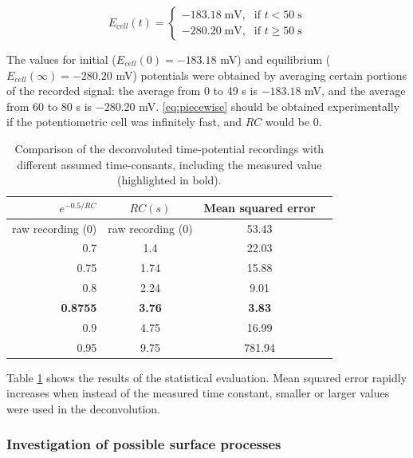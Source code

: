 \begin{equation}
E_{cell}(t) =
\left\{
	\begin{array}{ll}
		-183.18 \; \textrm{mV,} & \mbox{if } t < 50 \; \textrm{s} \\
		-280.20 \; \textrm{mV,} & \mbox{if } t \geq  50 \; \textrm{s}
	\end{array}
\right.
\label{eq:piecewise}
\end{equation}

The values for initial ($E_{cell}(0) = -183.18$ mV) and equilibrium ($E_{cell}(\infty) = -280.20$ mV) potentials were obtained by averaging certain portions of the recorded signal: the average from 0 to 49 s is $-183.18$ mV, and the average from 60 to 80 s is $-280.20$ mV.
\ref{eq:piecewise} should be obtained experimentally if the potentiometric cell was infinitely fast, and $RC$ would be 0.

\begin{table}
                \caption{Comparison of the deconvoluted time-potential recordings with different assumed time-consants, including the measured value (highlighted in bold).}
                \label{table:rc}
                \centering
                \begin{tabular}{r c c c}
                        $e^{-0.5/RC}$ & $RC (s)$ & Mean squared error \\
                        \hline
                        raw recording (0) & raw recording (0) & 53.43 \\
                        0.7 & 1.4 & 22.03  \\
                        0.75 & 1.74 & 15.88  \\
                        0.8 & 2.24 & 9.01 \\
			\textbf{0.8755} & \textbf{3.76} & \textbf{3.83} \\
			0.9 & 4.75 & 16.99 \\
			0.95 & 9.75 & 781.94 \\
                \end{tabular}
\end{table}

Table \ref{table:rc} shows the results of the statistical evaluation.
Mean squared error rapidly increases when instead of the measured time constant, smaller or larger values were used in the deconvolution.

\subsubsection{Investigation of possible surface processes}

